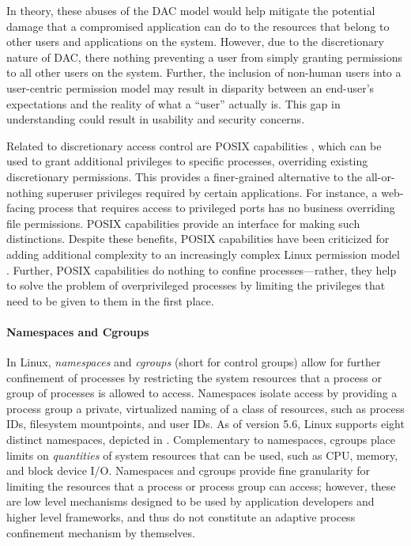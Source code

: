 \documentclass[dvipsnames, 12pt]{article}
\begin{document}
In theory, these abuses of the DAC model would help mitigate the potential
damage that a compromised application can do to the resources that belong to
other users and applications on the system. However, due to the discretionary
nature of DAC, there nothing preventing a user from simply granting permissions
to all other users on the system. Further, the inclusion of non-human users into
a user-centric permission model may result in disparity between an end-user's
expectations and the reality of what a \enquote{user} actually is. This gap in
understanding could result in usability and security concerns.

Related to discretionary access control are POSIX capabilities
\cite{posix_capabilities,corbet2006_capabities_a,corbet2006_capabities_b}, which
can be used to grant additional privileges to specific processes, overriding
existing discretionary permissions. This provides a finer-grained alternative to
the all-or-nothing superuser privileges required by certain applications. For
instance, a web-facing process that requires access to privileged ports has no
business overriding file permissions. POSIX capabilities provide an interface
for making such distinctions. Despite these benefits, POSIX capabilities have
been criticized for adding additional complexity to an increasingly complex
Linux permission model \cite{corbet2006_capabities_b,corbet2006_capabities_a}.
Further, POSIX capabilities do nothing to confine processes---rather, they help
to solve the problem of overprivileged processes by limiting the privileges that
need to be given to them in the first place.

\paragraph*{Namespaces and Cgroups}
In Linux, \textit{namespaces} and \textit{cgroups} (short for control groups)
allow for further confinement of processes by restricting the system resources
that a process or group of processes is allowed to access. Namespaces isolate
access by providing a process group a private, virtualized naming of a class of
resources, such as process IDs, filesystem mountpoints, and user IDs. As of
version 5.6, Linux supports eight distinct namespaces, depicted in
.  Complementary to namespaces, cgroups place limits on
\textit{quantities} of system resources that can be used, such as CPU, memory,
and block device I/O.  Namespaces and cgroups provide fine granularity for
limiting the resources that a process or process group can access; however,
these are low level mechanisms designed to be used by application developers and
higher level frameworks, and thus do not constitute an adaptive process
confinement mechanism by themselves.
\end{document}
